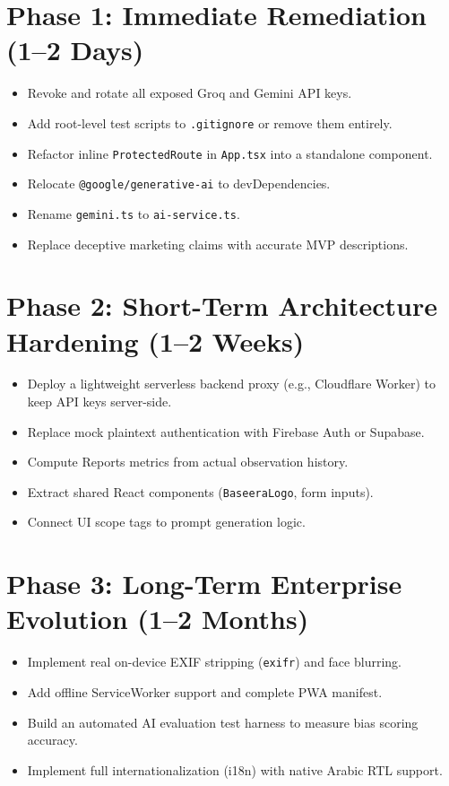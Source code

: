 \documentclass[10pt,a4paper]{report}
\begin{document}
\section{Phase 1: Immediate Remediation (1--2 Days)}
\begin{itemize}[leftmargin=1.5em]
    \item Revoke and rotate all exposed Groq and Gemini API keys.
    \item Add root-level test scripts to \texttt{.gitignore} or remove them entirely.
    \item Refactor inline \texttt{ProtectedRoute} in \texttt{App.tsx} into a standalone component.
    \item Relocate \texttt{@google/generative-ai} to devDependencies.
    \item Rename \texttt{gemini.ts} to \texttt{ai-service.ts}.
    \item Replace deceptive marketing claims with accurate MVP descriptions.
\end{itemize}

\section{Phase 2: Short-Term Architecture Hardening (1--2 Weeks)}
\begin{itemize}[leftmargin=1.5em]
    \item Deploy a lightweight serverless backend proxy (e.g., Cloudflare Worker) to keep API keys server-side.
    \item Replace mock plaintext authentication with Firebase Auth or Supabase.
    \item Compute Reports metrics from actual observation history.
    \item Extract shared React components (\texttt{BaseeraLogo}, form inputs).
    \item Connect UI scope tags to prompt generation logic.
\end{itemize}

\section{Phase 3: Long-Term Enterprise Evolution (1--2 Months)}
\begin{itemize}[leftmargin=1.5em]
    \item Implement real on-device EXIF stripping (\texttt{exifr}) and face blurring.
    \item Add offline ServiceWorker support and complete PWA manifest.
    \item Build an automated AI evaluation test harness to measure bias scoring accuracy.
    \item Implement full internationalization (i18n) with native Arabic RTL support.
\end{itemize}
\end{document}
